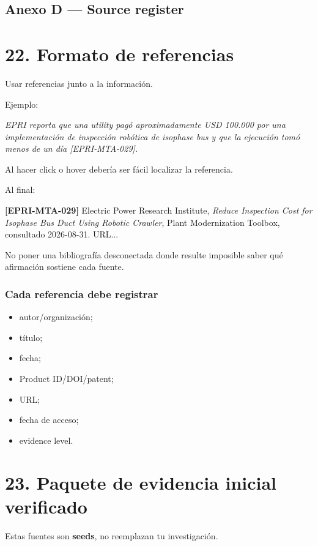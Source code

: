 \documentclass[11pt,a4paper]{article}
\newenvironment{callout}
  {\par\medskip\noindent
   \begin{lrbox}{\calloutbox}%
   \begin{minipage}{\dimexpr\linewidth-2.2em\relax}\itshape}
  {\end{minipage}\end{lrbox}%
   \noindent{\color{accent}\vrule width 2.5pt}\hspace{0.6em}%
   \colorbox{calloutbg}{\usebox{\calloutbox}}\par\medskip}
\begin{document}
\subsection*{Anexo D — Source register}

\section*{22. Formato de referencias}
Usar referencias junto a la información.

Ejemplo:

\begin{callout}
EPRI reporta que una utility pagó aproximadamente USD 100.000 por una implementación de inspección robótica de isophase bus y que la ejecución tomó menos de un día [EPRI-MTA-029].
\end{callout}

Al hacer click o hover debería ser fácil localizar la referencia.

Al final:

\textbf{[EPRI-MTA-029]} Electric Power Research Institute, \emph{Reduce Inspection Cost for Isophase Bus Duct Using Robotic Crawler}, Plant Modernization Toolbox, consultado 2026-08-31. URL...

No poner una bibliografía desconectada donde resulte imposible saber qué afirmación sostiene cada fuente.


\subsubsection*{Cada referencia debe registrar}
\begin{itemize}
\item autor/organización;
\item título;
\item fecha;
\item Product ID/DOI/patent;
\item URL;
\item fecha de acceso;
\item evidence level.
\end{itemize}


\section*{23. Paquete de evidencia inicial verificado}
Estas fuentes son \textbf{seeds}, no reemplazan tu investigación.
\end{document}
